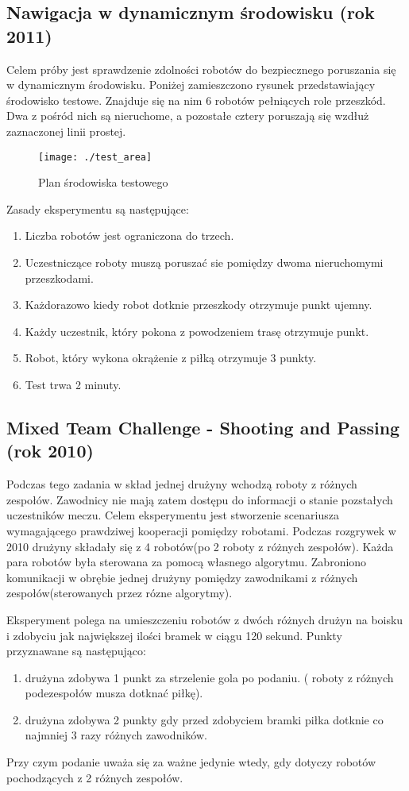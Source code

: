 \documentclass[11pt,onecolumn,a4paper,final]{article}
\begin{document}
\subsection*{ Nawigacja w dynamicznym środowisku (rok 2011)}
Celem próby jest sprawdzenie zdolności robotów do bezpiecznego poruszania się w dynamicznym środowisku. Poniżej zamieszczono rysunek przedstawiający 
środowisko testowe. Znajduje się na nim 6 robotów pełniących role przeszkód. Dwa z pośród nich są nieruchome, a pozostałe cztery poruszają się wzdłuż
zaznaczonej linii prostej.
\begin{figure}[!h]
\centering
\texttt{[image: ./test\_area]}
\caption{Plan środowiska testowego} \label{fig:arch}
\end{figure}
Zasady eksperymentu są następujące:
\begin{enumerate}
\item Liczba robotów jest ograniczona do trzech.
\item Uczestniczące roboty muszą poruszać sie pomiędzy dwoma nieruchomymi przeszkodami.
\item Każdorazowo kiedy robot dotknie przeszkody otrzymuje punkt ujemny.
\item Każdy uczestnik, który pokona z powodzeniem trasę otrzymuje punkt.
\item Robot, który wykona okrążenie z piłką otrzymuje 3 punkty.
\item Test trwa 2 minuty.
\end{enumerate}

\subsection*{ Mixed Team Challenge - Shooting and Passing (rok 2010)}
Podczas tego zadania w skład jednej drużyny wchodzą roboty z różnych zespołów. Zawodnicy nie mają zatem dostępu do informacji o stanie pozstałych 
uczestników meczu. Celem eksperymentu jest stworzenie scenariusza wymagającego prawdziwej kooperacji pomiędzy robotami.
Podczas rozgrywek w 2010 drużyny składały się z 4 robotów(po 2 roboty z różnych zespołów).
Każda para robotów była sterowana za pomocą własnego algorytmu. 
Zabroniono komunikacji w obrębie jednej drużyny pomiędzy zawodnikami z różnych zespołów(sterowanych przez rózne algorytmy).

Eksperyment polega na umieszczeniu robotów z dwóch różnych drużyn na boisku i zdobyciu jak największej ilości bramek w ciągu 120 sekund.
Punkty przyznawane są następująco: 
\begin{enumerate}
    \item drużyna zdobywa 1 punkt za strzelenie gola po podaniu. ( roboty z różnych podezespołów musza dotknać piłkę). 
    \item drużyna zdobywa 2 punkty gdy przed zdobyciem bramki piłka dotknie co najmniej 3 razy różnych zawodników.
\end{enumerate}
Przy czym podanie uważa się za ważne jedynie wtedy, gdy dotyczy robotów pochodzących z 2 różnych zespołów.
\end{document}
